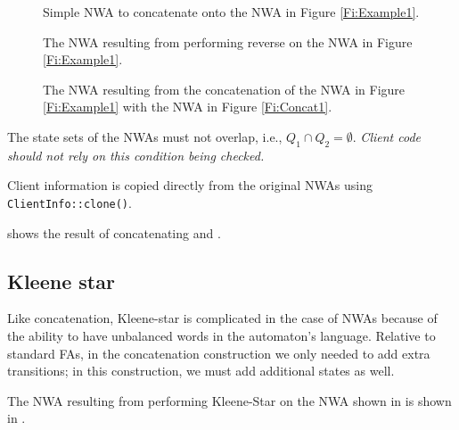 \begin{figure}[p]
  \centering
  \begin{minipage}{0.5\textwidth}
    \begin{minipage}{\textwidth}
      \centering
      \caption{Simple NWA to concatenate onto the NWA in Figure \ref{Fi:Example1}.}
      \label{Fi:Concat1}
    \end{minipage}

    \vspace{2\baselineskip}
    \begin{minipage}{0.8\textwidth}
      \centering
      \caption{The NWA resulting from performing reverse on the NWA in Figure \ref{Fi:Example1}.}
      \label{Fi:Reverse1}
    \end{minipage}
  \end{minipage}
  \begin{minipage}{0.49\textwidth}
    \centering
    \caption{The NWA resulting from the concatenation of the NWA in Figure
      \ref{Fi:Example1} with the NWA in Figure \ref{Fi:Concat1}.}
    \label{Fi:Concat2}
  \end{minipage}
\end{figure}

\antistupidfloats



The state sets of the NWAs must not overlap,
i.e., $Q_1 \cap Q_2 = \emptyset$. \textsl{Client code should not rely on
  this condition being checked.}

Client information is copied directly from the original NWAs using
\texttt{ClientInfo::clone()}.

 shows the result of concatenating  and
.

\subsection{Kleene star}
\label{Se:Star}

Like concatenation, Kleene-star is complicated in the case of NWAs because of
the ability to have unbalanced words in the automaton's
language. Relative to standard FAs, in the concatenation construction we only needed
to add extra transitions; in this construction, we must add additional states
as well.

The NWA resulting from performing Kleene-Star on the NWA shown in
 is shown in .

